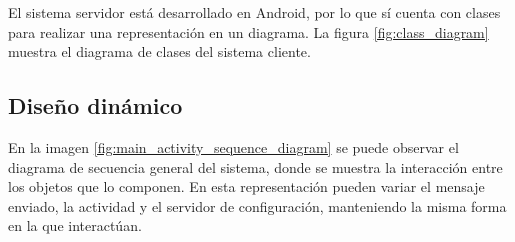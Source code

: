 \documentclass[12pt]{article}
\begin{document}
        El sistema servidor está desarrollado en Android, por lo que sí cuenta con clases para realizar una representación en un diagrama. La figura \ref{fig:class_diagram} muestra el diagrama de clases del sistema cliente.
        
    \pagebreak

    \subsection{Diseño dinámico}
    
    En la imagen \ref{fig:main_activity_sequence_diagram} se puede observar el diagrama de secuencia general del sistema, donde se muestra la interacción entre los objetos que lo componen. En esta representación pueden variar el mensaje enviado, la actividad y el servidor de configuración, manteniendo la misma forma en la que interactúan.
\end{document}
